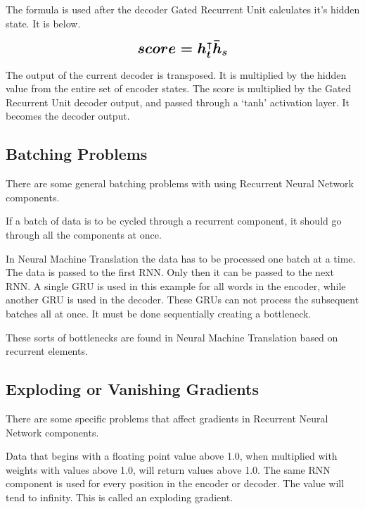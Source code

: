 The formula is used after the decoder Gated Recurrent Unit calculates it's hidden state. It is below.

$$ 
\boldmath
\mathlarger{ \mathlarger{
score = h_t^\intercal \bar{h}_s 
} }
\unboldmath
$$ 

The output of the current decoder is transposed. It is multiplied by the hidden value from the entire set of encoder states. The score is multiplied by the Gated Recurrent Unit decoder output, and passed through a `tanh' activation layer. It becomes the decoder output.

\subsection{Batching Problems}

\label{section-gru-batching-problems}

There are some general batching problems with using Recurrent Neural Network components.

If a batch of data is to be cycled through a recurrent component, it should go through all the components at once.  


In Neural Machine Translation the data has to be processed one batch at a time. The data is passed to the first RNN. Only then it can be passed to the next RNN. A single GRU is used in this example for all words in the encoder, while another GRU is used in the decoder. These GRUs can not process the subsequent batches all at once. It must be done sequentially creating a bottleneck. 


These sorts of bottlenecks are found in Neural Machine Translation based on recurrent elements.

\subsection{Exploding or Vanishing Gradients}

\label{section-gru-gradient-problems}

There are some specific problems that affect gradients in Recurrent Neural Network components.

Data that begins with a floating point value above 1.0, when multiplied with weights with  values above 1.0, will return values above 1.0. The same RNN component is used for every position in the encoder or decoder. The value will tend to infinity. This is called an exploding gradient. 

